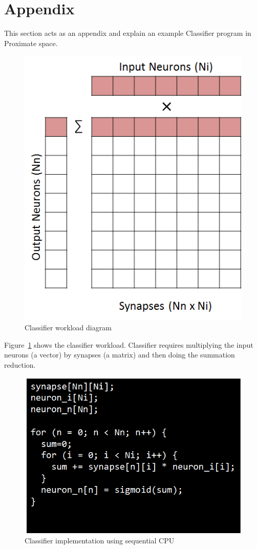 \section{Appendix}\label{sec:appendix}

This section acts as an appendix and explain an example Classifier program in Proximate space.  

\begin{figure}[h]
  \begin{center}
    \includegraphics[width=0.3\linewidth]{cs758-figs/classifier-diagram.png}
  \end{center}
\vspace{-0.2in}
  \caption{Classifier workload diagram}
  \label{fig:classifier-diagram}
\vspace{-0.05in}
\end{figure}

Figure~\ref{fig:classifier-diagram} shows the classifier workload. 
Classifier requires multiplying the input neurons (a vector) by synapses 
(a matrix) and then doing the summation reduction.


\begin{figure}
  \begin{center}
    \includegraphics[width=0.5\linewidth]{cs758-figs/classifier-cpu.png}
  \end{center}
\vspace{-0.2in}
  \caption{Classifier implementation using sequential CPU}
  \label{fig:classifier-cpu}
\vspace{-0.05in}
\end{figure}

